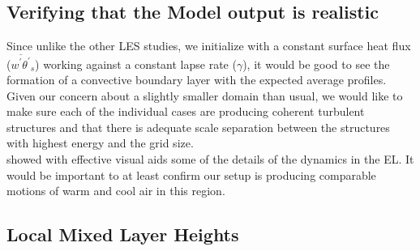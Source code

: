 \subsection{Verifying that the Model output is realistic}

Since unlike the other LES studies, we initialize with a constant surface heat flux ($\overline{w^{'}\theta^{'}}_{s}$) working against a constant lapse rate ($\gamma$), it would be good to see the formation of a convective boundary layer with the expected average profiles.\\

Given our concern about a slightly smaller domain than usual, we would like to make sure each of the individual cases are producing coherent turbulent structures and that there is adequate scale separation between the structures with highest energy and the grid size.\\

\citeauthor{SullMoengStev} \cite{SullMoengStev} showed with effective visual aids some of the details of the dynamics in the \acs{EL}.  It would be important to at least confirm our setup is producing comparable motions of warm and cool air in this region.\\  


\subsection{Local Mixed Layer Heights}

